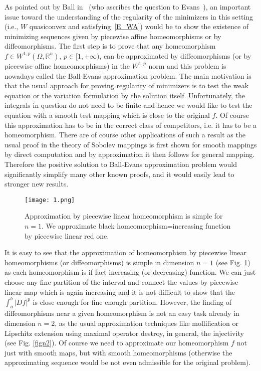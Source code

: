 \documentclass[12pt,a4paper]{amsart}
\theoremstyle{plain}
\theoremstyle{definition}
\numberwithin{equation}{section}
\def\rn{\mathbb R^n}
\newcounter{problem}
\begin{document}
As pointed out by Ball in~\cite{Ball, Ball2} (who ascribes the question to Evans~\cite{Evans}), an important issue toward the understanding of the regularity of the minimizers in this setting (i.e., $W$ quasiconvex and satisfying~\eqref{E_WA}) would be to show the existence of minimizing sequences given by piecewise affine homeomorphisms or by diffeomorphisms. 
The first step is to prove that any homeomorphism $f\in W^{1,p}(\Omega,\rn)$, $p\in[1,+\infty)$, can be approximated by diffeomorphisms (or by piecewise affine homeomorphisms) in the $W^{1,p}$ norm and this problem is nowadays called the Ball-Evans approximation problem. The main motivation is that the usual approach for proving regularity of minimizers is to test the weak equation or the variation formulation by the solution itself. 
Unfortunately,  the integrals in question do not need to be finite and hence we would like to test the equation with a smooth test mapping which is close to the original $f$. Of course this approximation has to be in the correct class of competitors, i.e. it has to be a homeomorphism. 
There are of course other applications of such a result as the usual proof in the theory of Sobolev mappings is first shown for smooth mappings by direct computation and by approximation it then follows for general mapping. Therefore the positive solution to Ball-Evans approximation problem  
would significantly simplify many other known proofs, and it would easily lead to stronger new results. 


\begin{figure}
\centering
\vskip -20pt
\texttt{[image: 1.png]}
\vskip -20pt
\caption{Approximation by piecewise linear homeomorphism is simple for $n=1$. We approximate black homeomorphism=increasing function by piecewise linear red one.}\label{fign1}
\end{figure}

It is easy to see that the approximation of homeomorphism by piecewise linear homeomorphisms (or diffeomorphisms) is simple in dimension $n=1$ (see Fig. \ref{fign1}) as each homeomorphism is if fact increasing (or decreasing) function. We can just choose any fine partition of the interval and connect the values by piecewise linear map which is again increasing and it is not difficult to show that the $\int_a^b |Df|^p$ is close enough for fine enough partition. 
However, the finding of diffeomorphisms near a given homeomorphism is not an easy task already in dimension $n=2$, as the usual approximation techniques like mollification or Lipschitz extension using maximal operator destroy, in general, the injectivity (see Fig. \ref{fign2}). Of course we need to approximate our homeomorphism $f$ not just with smooth maps, but with smooth homeomorphisms (otherwise the approximating sequence would be not even admissible for the original problem). 
\end{document}
